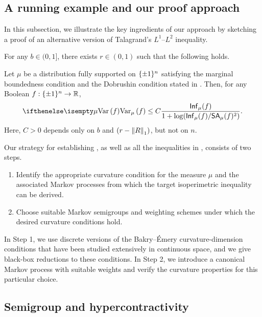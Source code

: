 \subsection{A running example and our proof approach}
In this subsection, we illustrate the key ingredients of our approach by sketching a proof of an alternative version of Talagrand's $L^1$--$L^2$ inequality. 


\begin{theorem}
\label{thm:alt-L1-L2}
    For any $b \in (0,1]$, there exists $r \in (0,1)$ such that the following holds.
    
    Let $\mu$ be a distribution fully supported on $\{\pm 1\}^n$ satisfying the marginal boundedness condition and the Dobrushin condition stated in . 
    Then, for any Boolean $f: \{\pm 1\}^n \to \mathbb{R}$,
    \begin{align}\label{eq:alt-L1-L2}
        \Var[\mu]{f} \le C \frac{\Inf_\mu(f)}{1 + \log (\Inf_\mu(f)/\SurfArea_\mu(f)^2)}.
    \end{align}
    Here, $C>0$ depends only on $b$ and $(r-\left\lVert R \right\rVert_1)$, but not on $n$.
\end{theorem}

Our strategy for establishing , as well as all the inequalities in , consists of two steps.
\begin{enumerate}
    \item Identify the appropriate curvature condition for the measure $\mu$ and the associated Markov processes from which the target isoperimetric inequality can be derived. 

    \item Choose suitable Markov semigroups and weighting schemes under which the desired curvature conditions hold.
\end{enumerate}

In Step 1, we use discrete versions of the Bakry--\'Emery curvature-dimension conditions that have been studied extensively in continuous space, and we give black-box reductions to these conditions.
In Step 2, we introduce a canonical Markov process with suitable weights and verify the curvature properties for this particular choice.

\subsection{Semigroup and hypercontractivity}

